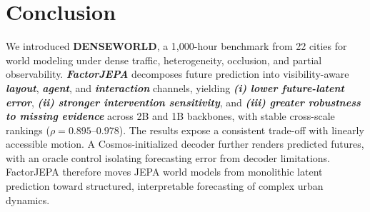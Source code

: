 \section{\textbf{Conclusion}}

We introduced \textbf{DENSEWORLD}, a 1,000-hour benchmark from 22 cities for
world modeling under dense traffic, heterogeneity, occlusion, and partial
observability. \textbf{\emph{FactorJEPA}} decomposes future prediction into
visibility-aware \textbf{\emph{layout}}, \textbf{\emph{agent}}, and
\textbf{\emph{interaction}} channels, yielding
\textbf{\emph{(i) lower future-latent error}},
\textbf{\emph{(ii) stronger intervention sensitivity}}, and
\textbf{\emph{(iii) greater robustness to missing evidence}}
across 2B and 1B backbones, with stable cross-scale rankings
($\rho=0.895$--$0.978$). The results expose a consistent trade-off with
linearly accessible motion. A Cosmos-initialized decoder further renders
predicted futures, with an oracle control isolating forecasting error from
decoder limitations. FactorJEPA therefore moves JEPA world models from
monolithic latent prediction toward structured, interpretable forecasting of
complex urban dynamics.